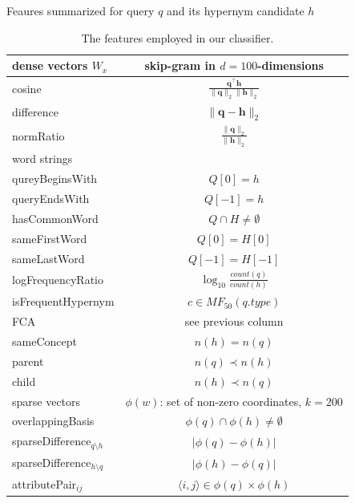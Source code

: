 \documentclass{beamer}
\newlength{\onecolwid}
\begin{document}
\begin{frame}[t]
\begin{columns}[t]
\begin{column}{\onecolwid}
    \begin{block}{Feaures summarized}{ for query $q$ and its hypernym candidate $h$ }
      \begin{table}
        \begin{tabular}{lc}
          \toprule
          \alert{dense vectors $W_x$}   & skip-gram in $d=100$-dimensions
          \\ \midrule
          {cosine}            & $\frac{\mathbf{q}^\intercal \mathbf{h}}{\lVert \mathbf{q} \rVert_2\lVert \mathbf{h} \rVert_2}$ \\ %
          {difference}        & $\lVert \mathbf{q} - \mathbf{h} \rVert_2$ \\ %
          {normRatio}         & $\frac{\lVert \mathbf{q}\rVert_2}{\lVert
          \mathbf{h} \rVert_2}$ \\ %
          \midrule 
          \alert{word strings}   & \\ 
          \midrule
          {qureyBeginsWith}   & $Q[0] = h$ \\ %
          {queryEndsWith}     & $Q[-1] = h$ \\
          {hasCommonWord} & $Q \cap H \neq \emptyset$ \\ %
          {sameFirstWord}        & $Q[0] = H[0]$ \\ %
          {sameLastWord}        & $Q[-1] = H[-1]$ \\
          {logFrequencyRatio} & $\log_{10}\frac{count(q)}{count(h)}$ \\ %
          {isFrequentHypernym}\footnotemark & $c \in MF_{50}(q.type)$\\
          \midrule 
          \alert{FCA} & see previous column    \\ 
          \midrule
          sameConcept & $n(h)=n(q)$ \\
          parent  & $n(q)\prec n(h)$ \\
          child  & $n(h)\prec n(q)$ \\
          \midrule 
          \alert{sparse vectors}   &  $\phi(w)$: set of non-zero coordinates,
          $k=200$  \\
          \midrule
          {overlappingBasis}  & $\phi(q) \cap \phi(h) \neq \emptyset$ \\ %
          {sparseDifference$_{q\setminus h}$} & $\lvert \phi(q) - \phi(h) \rvert$ \\ %
          {sparseDifference$_{h\setminus q}$} & $\lvert \phi(h) - \phi(q) \rvert$ \\
          attributePair$_{ij}$      & $\langle i,j\rangle\in\phi(q)\times\phi(h)$ \\ %
          \bottomrule
        \end{tabular}
        \caption{The features employed in our classifier. \\
        }
        \label{table:core_features}
      \end{table}


\end{block}
\end{column}
\end{columns}
\end{frame}
\end{document}

